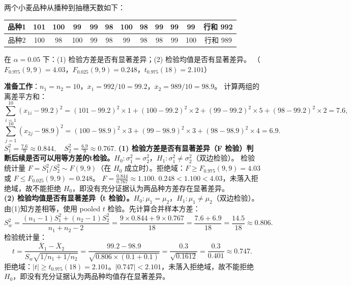 \documentclass[lang=cn,11pt]{elegantbook}
\begin{document}
\begin{exercise}\label{exer:9-f-test}
两个小麦品种从播种到抽穗天数如下：
\begin{center}
\begin{tabular}{ccccccccccc|c}
\toprule
品种1 & 101 & 100 & 99 & 99 & 98 & 100 & 98 & 99 & 99 & 99 & 行和 992 \\
\midrule
品种2 & 100 & 98 & 100 & 99 & 98 & 99 & 98 & 98 & 99 & 100 & 行和 989 \\
\bottomrule
\end{tabular}
\end{center}
在 \(\alpha=0.05\) 下：(1) 检验方差是否有显著差异；(2) 检验均值是否有显著差异。
（\(F_{0.975}(9,9)=4.03\)，\(F_{0.025}(9,9)=0.248\)，\(t_{0.975}(18)=2.101\)）
\end{exercise}
\begin{solution}
\textbf{准备工作}：\(n_1=n_2=10\)，\(\overline{x}_1=992/10=99.2\)，\(\overline{x}_2=989/10=98.9\)。
计算两组的离差平方和：
\[
\sum_{i=1}^{10}(x_{1i}-99.2)^2 = (101{-}99.2)^2\!\times\!1 + (100{-}99.2)^2\!\times\!2 + (99{-}99.2)^2\!\times\!5 + (98{-}99.2)^2\!\times\!2 = 7.6,
\]
\[
\sum_{j=1}^{10}(x_{2j}-98.9)^2 = (100{-}98.9)^2\!\times\!3 + (99{-}98.9)^2\!\times\!3 + (98{-}98.9)^2\!\times\!4 = 6.9.
\]
\(
S_1^2 = \frac{7.6}{9} \approx 0.844,\quad S_2^2 = \frac{6.9}{9} \approx 0.767.
\)
\textbf{(1) 检验方差是否有显著差异（F 检验）判断后续是否可以用等方差的t检验。}\(H_0\colon \sigma_1^2=\sigma_2^2\)，\(H_1\colon \sigma_1^2\neq\sigma_2^2\)（双边检验）。
检验统计量 \(F = S_1^2/S_2^2 \sim F(9,9)\)（在 \(H_0\) 成立时）。拒绝域：\(F \geq F_{0.975}(9,9)=4.03\) 或 \(F \leq F_{0.025}(9,9)=0.248\)。
\(
F = \frac{0.844}{0.767} \approx 1.100.
\)
\(0.248 < 1.100 < 4.03\)，未落入拒绝域，故不能拒绝 \(H_0\)，即没有充分证据认为两品种方差存在显著差异。\\
\textbf{(2) 检验均值是否有显著差异（t 检验）。}\(H_0\colon \mu_1=\mu_2\)，\(H_1\colon \mu_1\neq\mu_2\)（双边检验）。由(1)知方差相等，使用 pooled \(t\) 检验。先计算合并样本方差：
\[
S_w^2 = \frac{(n_1-1)S_1^2+(n_2-1)S_2^2}{n_1+n_2-2} = \frac{9\times0.844+9\times0.767}{18} = \frac{7.6+6.9}{18} = \frac{14.5}{18} \approx 0.806.
\]
检验统计量：
\[
t = \frac{\overline{X}_1-\overline{X}_2}{S_w\sqrt{1/n_1+1/n_2}} = \frac{99.2-98.9}{\sqrt{0.806\times(0.1+0.1)}} = \frac{0.3}{\sqrt{0.1612}} = \frac{0.3}{0.401} \approx 0.747.
\]
拒绝域：\(|t| \geq t_{0.975}(18)=2.101\)。\(|0.747| < 2.101\)，未落入拒绝域，故不能拒绝 \(H_0\)，即没有充分证据认为两品种均值存在显著差异。
\end{solution}
\end{document}
